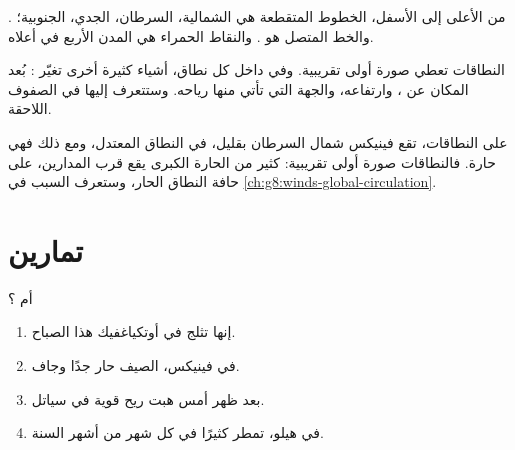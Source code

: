 \begin{omfigure}
{\small {}. من الأعلى إلى الأسفل، الخطوط المتقطعة هي
 الشمالية،  السرطان،  الجدي، 
الجنوبية؛ والخط المتصل هو . والنقاط الحمراء هي المدن الأربع
في  أعلاه.}
\end{omfigure}

النطاقات تعطي صورة أولى تقريبية. وفي داخل كل نطاق، أشياء كثيرة أخرى
تغيّر : بُعد المكان عن ، وارتفاعه، والجهة التي تأتي منها
رياحه. وستتعرف إليها في الصفوف اللاحقة.

\begin{remark}\label{rem:g5:weather-and-climate:phoenix}
على  النطاقات، تقع فينيكس شمال  السرطان بقليل،
في النطاق المعتدل، ومع ذلك فهي  حارة. فالنطاقات صورة
أولى تقريبية: كثير من  الحارة الكبرى يقع قرب المدارين،
على حافة النطاق الحار، وستعرف السبب في
\cref{ch:g8:winds-global-circulation}.
\end{remark}

\section{تمارين}

\begin{exercise}[$\star$]\label{exo:g5:weather-and-climate:1}
 أم ؟
\begin{enumerate}
  \item[(أ)] إنها تثلج في أوتكياغفيك هذا الصباح.
  \item[(ب)] في فينيكس، الصيف حار جدًا وجاف.
  \item[(ج)] بعد ظهر أمس هبت ريح قوية في سياتل.
  \item[(د)] في هيلو، تمطر كثيرًا في كل شهر من أشهر السنة.
\end{enumerate}
\end{exercise}

